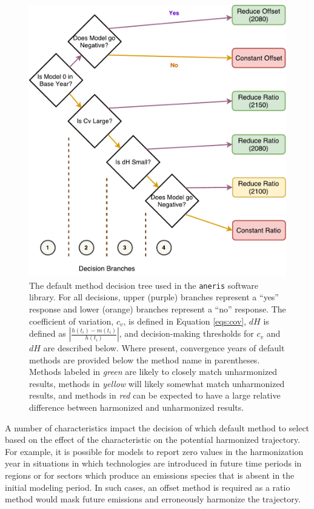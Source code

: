 \documentclass[review]{elsarticle}
\newcommand{\code}[1]{\lstinline[basicstyle=\ttfamily\color{black}]|#1|}
\begin{document}
\begin{figure}
  \begin{center}
    \includegraphics[width=\textwidth]{decision_tree.pdf}
    \caption[]{
      \label{fig:decision_tree}
      The default method decision tree used in the \code{aneris} software
      library. For all decisions, upper (purple) branches represent a ``yes''
      response and lower (orange) branches represent a ``no'' response. The
      coefficient of variation, $c_v$, is defined in Equation \ref{eqs:cov},
      $dH$ is defined as $\left|\frac{h(t_i) - m(t_i)}{h(t_i)}\right|$, and
      decision-making thresholds for $c_v$ and $dH$ are described below.  Where
      present, convergence years of default methods are provided below the
      method name in parentheses.  Methods labeled in \textit{green} are likely
      to closely match unharmonized results, methods in \textit{yellow} will
      likely somewhat match unharmonized results, and methods in \textit{red}
      can be expected to have a large relative difference between harmonized and
      unharmonized results.}
  \end{center}
\end{figure}

A number of characteristics impact the decision of which default method to
select based on the effect of the characteristic on the potential harmonized
trajectory. For example, it is possible for models to report zero values in the
harmonization year in situations in which technologies are introduced in future
time periods in regions or for sectors which produce an emissions species that
is absent in the initial modeling period. In such cases, an offset method is
required as a ratio method would mask future emissions and erroneously harmonize
the trajectory. 
\end{document}
